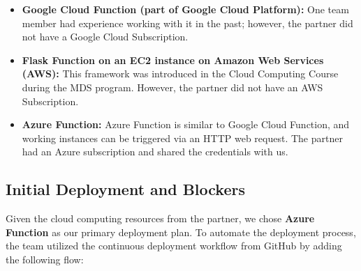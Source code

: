 \documentclass[
  11pt,
  a4paper,
  DIV=11,
  numbers=noendperiod]{scrartcl}
\newenvironment{Shaded}{\begin{snugshade}}{\end{snugshade}}
\newcommand{\AttributeTok}[1]{\textcolor[rgb]{0.40,0.45,0.13}{#1}}
\newcommand{\CharTok}[1]{\textcolor[rgb]{0.13,0.47,0.30}{#1}}
\newcommand{\FunctionTok}[1]{\textcolor[rgb]{0.28,0.35,0.67}{#1}}
\newcommand{\KeywordTok}[1]{\textcolor[rgb]{0.00,0.23,0.31}{\textbf{#1}}}
\newcommand{\StringTok}[1]{\textcolor[rgb]{0.13,0.47,0.30}{#1}}
\providecommand{\tightlist}{%
  \setlength{\itemsep}{0pt}\setlength{\parskip}{0pt}}\usepackage{longtable,booktabs,array}
\begin{document}
\begin{itemize}
\tightlist
\item
  \textbf{Google Cloud Function (part of Google Cloud Platform):} One
  team member had experience working with it in the past; however, the
  partner did not have a Google Cloud Subscription.
\item
  \textbf{Flask Function on an EC2 instance on Amazon Web Services
  (AWS):} This framework was introduced in the Cloud Computing Course
  during the MDS program. However, the partner did not have an AWS
  Subscription.
\item
  \textbf{Azure Function:} Azure Function is similar to Google Cloud
  Function, and working instances can be triggered via an HTTP web
  request. The partner had an Azure subscription and shared the
  credentials with us.
\end{itemize}

\subsection{Initial Deployment and
Blockers}\label{initial-deployment-and-blockers}

Given the cloud computing resources from the partner, we chose
\textbf{Azure Function} as our primary deployment plan. To automate the
deployment process, the team utilized the continuous deployment workflow
from GitHub by adding the following flow:

\begin{Shaded}
\end{Shaded}
\end{document}
